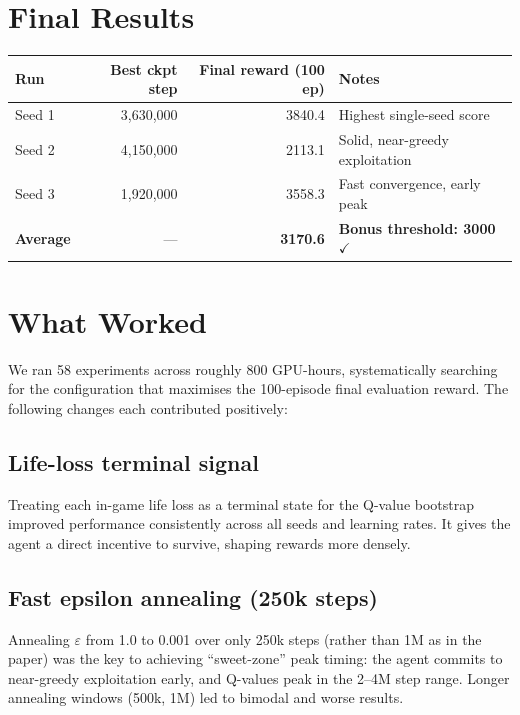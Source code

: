 \documentclass[11pt,a4paper]{article}
\begin{document}
\section{Final Results}

\begin{center}
\begin{tabular}{lrrl}
\toprule
\textbf{Run} & \textbf{Best ckpt step} & \textbf{Final reward (100 ep)} & \textbf{Notes} \\
\midrule
Seed 1 & 3{,}630{,}000 & 3840.4 & Highest single-seed score \\
Seed 2 & 4{,}150{,}000 & 2113.1 & Solid, near-greedy exploitation \\
Seed 3 & 1{,}920{,}000 & 3558.3 & Fast convergence, early peak \\
\midrule
\textbf{Average} & — & \textbf{3170.6} & \textcolor{green!60!black}{\textbf{Bonus threshold: 3000 $\checkmark$}} \\
\bottomrule
\end{tabular}
\end{center}

\section{What Worked}

We ran 58 experiments across roughly 800 GPU-hours, systematically searching for the
configuration that maximises the 100-episode final evaluation reward. The following
changes each contributed positively:

\subsection{Life-loss terminal signal}
Treating each in-game life loss as a terminal state for the Q-value bootstrap
improved performance consistently across all seeds and learning rates. It gives
the agent a direct incentive to survive, shaping rewards more densely.

\subsection{Fast epsilon annealing (250k steps)}
Annealing $\varepsilon$ from 1.0 to 0.001 over only 250k steps (rather than 1M as in
the paper) was the key to achieving ``sweet-zone'' peak timing: the agent commits to
near-greedy exploitation early, and Q-values peak in the 2–4M step range.
Longer annealing windows (500k, 1M) led to bimodal and worse results.
\end{document}
